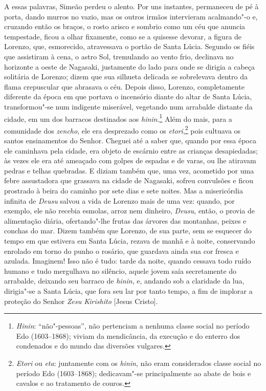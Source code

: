 A essas palavras, Simeão perdeu o alento. Por uns instantes, permaneceu
de pé à porta, dando murros no vazio, mas os outros irmãos intervieram
acalmando"-o e, cruzando então os braços, o rosto arisco e sombrio como
um céu que anuncia tempestade, ficou a olhar fixamente, como se a
quisesse devorar, a figura de Lorenzo, que, esmorecido, atravessava o
portão de Santa Lúcia. Segundo os fiéis que assistiram à cena, o astro
Sol, tremulando ao vento frio, declinava no horizonte a oeste de
Nagasaki, justamente do lado para onde se dirigia a cabeça solitária de
Lorenzo; dizem que sua silhueta delicada se sobrelevava dentro da flama
crepuscular que abrasava o céu. Depois disso, Lorenzo, completamente
diferente da época em que portava o incensório diante do altar de Santa
Lúcia, transformou"-se num indigente miserável, vegetando num arrabalde
distante da cidade, em um dos barracos destinados aos
\textit{hinin}.\footnote{ \textit{Hinin}: ``não"-pessoas'', não pertenciam
a nenhuma classe social no período Edo (1603--1868); viviam da
mendicância, da execução e do enterro dos condenados e do mundo das
diversões vulgares.} Além do mais, para a comunidade dos
\textit{zencho}, ele era desprezado como os \textit{etori},\footnote{ \textit{Etori} ou 
\textit{eta}: juntamente com os \textit{hinin}, não
eram considerados classe social no período Edo (1603--1868);
dedicavam"-se principalmente ao abate de bois e cavalos e ao tratamento
de couros.} pois cultuava os santos ensinamentos do Senhor. Cheguei
até a saber que, quando por essa época ele caminhava pela cidade, era
objeto de escárnio entre as crianças desapiedadas; às vezes ele era até
ameaçado com golpes de espadas e de varas, ou lhe atiravam pedras e
telhas quebradas. E diziam também que, uma vez, acometido por uma febre
assustadora que grassava na cidade de Nagasaki, sofreu convulsões e
ficou prostrado à beira do caminho por sete dias e sete noites. Mas a
misericórdia infinita de \textit{Deusu} salvou a vida de Lorenzo mais
de uma vez: quando, por exemplo, ele não recebia esmolas, arroz nem
dinheiro, \textit{Deusu}, então, o provia de alimentação diária,
ofertando"-lhe frutas das árvores das montanhas, peixes e conchas do
mar. Dizem também que Lorenzo, de sua parte, sem se esquecer do tempo
em que estivera em Santa Lúcia, rezava de manhã e à noite, conservando
enrolado em torno do punho o rosário, que guardava ainda sua cor fresca
e azulada. Imaginem! Isso não é tudo: tarde da noite, quando cessava
todo ruído humano e tudo mergulhava no silêncio, aquele jovem saía
secretamente do arrabalde, deixando seu barraco de \textit{hinin}, e,
andando sob a claridade da lua, dirigia"-se a Santa Lúcia, que fora seu
lar por tanto tempo, a fim de implorar a proteção do Senhor 
\textit{Zesu Kirishito} [Jesus Cristo].

